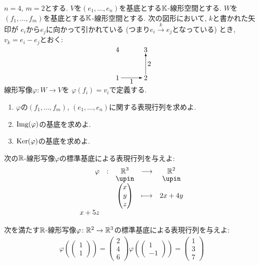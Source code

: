 \begin{quiz}
  $n=4$,
  $m=2$とする.
  $V$を$(e_1,\ldots,e_n)$を基底とする$\mathbb{K}$-線形空間とする.
  $W$を$(f_1,\ldots,f_m)$を基底とする$\mathbb{K}$-線形空間とする.
  次の図形において,
  $k$と書かれた矢印が
  $e_i$から$e_j$に向かって引かれている
  (つまり$e_i\xrightarrow{k} e_j$となっている)
  とき,
  $v_k=e_i-e_j$とおく:
  \begin{align*}
    \begin{picture}(40,40)
      \put(0,0){\makebox(0,0){1}}
      \put(40,0){\makebox(0,0){2}}
      \put(40,40){\makebox(0,0){3}}
      \put(0,40){\makebox(0,0){4}}
      \put(5,0){\vector(1,0){30}}      
      \put(40,5){\vector(0,1){30}}
      \put(20,-5){\makebox(0,0){1}}
      \put(45,20){\makebox(0,0){2}}
    \end{picture}
  \end{align*}
  線形写像$\varphi\colon W\to V$を
  $\varphi(f_i)=v_i$で定義する.
  \begin{enumerate}
  \item $\varphi$の$(f_1,\ldots,f_m)$, $(e_1,\ldots,e_n)$に関する表現行列を求めよ.
  \item $\operatorname{Img}(\varphi)$の基底を求めよ.
  \item $\operatorname{Ker}(\varphi)$の基底を求めよ.
  \end{enumerate}
\end{quiz}

\begin{quiz}
  次の$\mathbb{R}$-線形写像$\varphi$の標準基底による表現行列を与えよ:
  \begin{align*}
    \shazo{\varphi}{\RR^3}{\RR^2}
    {\begin{pmatrix}x\\y\\z\end{pmatrix}}{2x+4y\\x+5z}
  \end{align*}
\end{quiz}

\begin{quiz}
  次を満たす$\mathbb{R}$-線形写像$\varphi\colon \mathbb{R}^2\to \mathbb{R}^3$の標準基底による表現行列を与えよ:
  \begin{align*}
    \varphi(\begin{pmatrix}1\\1\end{pmatrix})=\begin{pmatrix}2\\4\\6\end{pmatrix}
    \varphi(\begin{pmatrix}1\\-1\end{pmatrix})=\begin{pmatrix}1\\3\\7\end{pmatrix}
  \end{align*}
\end{quiz}

